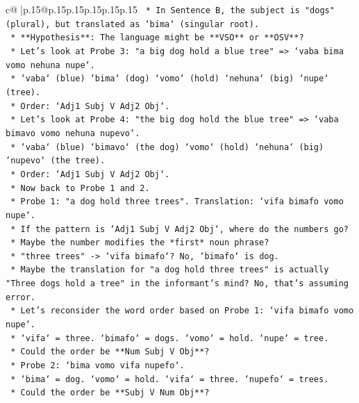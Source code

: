 \documentclass{article}
\begin{document}
{\begin{supertabular}{c@{$\;$}|p{.15\linewidth}@{}p{.15\linewidth}p{.15\linewidth}p{.15\linewidth}p{.15\linewidth}p{.15\linewidth}}
{{{\texttt{        *   In Sentence B, the subject is "dogs" (plural), but translated as `bima` (singular root).} \\
\texttt{        *   **Hypothesis**: The language might be **VSO** or **OSV**?} \\
\texttt{        *   Let's look at Probe 3: "a big dog hold a blue tree" => `vaba bima vomo nehuna nupe`.} \\
\texttt{            *   `vaba` (blue) `bima` (dog) `vomo` (hold) `nehuna` (big) `nupe` (tree).} \\
\texttt{            *   Order: `Adj1 Subj V Adj2 Obj`.} \\
\texttt{        *   Let's look at Probe 4: "the big dog hold the blue tree" => `vaba bimavo vomo nehuna nupevo`.} \\
\texttt{            *   `vaba` (blue) `bimavo` (the dog) `vomo` (hold) `nehuna` (big) `nupevo` (the tree).} \\
\texttt{            *   Order: `Adj1 Subj V Adj2 Obj`.} \\
\texttt{        *   Now back to Probe 1 and 2.} \\
\texttt{        *   Probe 1: "a dog hold three trees". Translation: `vifa bimafo vomo nupe`.} \\
\texttt{            *   If the pattern is `Adj1 Subj V Adj2 Obj`, where do the numbers go?} \\
\texttt{            *   Maybe the number modifies the *first* noun phrase?} \\
\texttt{            *   "three trees" {-}> `vifa bimafo`? No, `bimafo` is dog.} \\
\texttt{            *   Maybe the translation for "a dog hold three trees" is actually "Three dogs hold a tree" in the informant's mind? No, that's assuming error.} \\
\texttt{            *   Let's reconsider the word order based on Probe 1: `vifa bimafo vomo nupe`.} \\
\texttt{                *   `vifa` = three. `bimafo` = dogs. `vomo` = hold. `nupe` = tree.} \\
\texttt{                *   Could the order be **Num Subj V Obj**?} \\
\texttt{            *   Probe 2: `bima vomo vifa nupefo`.} \\
\texttt{                *   `bima` = dog. `vomo` = hold. `vifa` = three. `nupefo` = trees.} \\
\texttt{                *   Could the order be **Subj V Num Obj**?} \\
}}}
\end{supertabular}}
\end{document}

